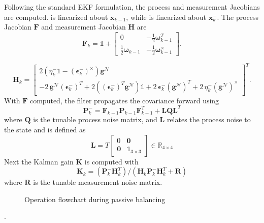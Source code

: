 Following the standard EKF formulation, the process and measurement Jacobians are computed.  is linearized about $\bm{x}_{k-1}$, while  is linearized about $\bm{x}_k^-$. The process Jacobian $\bm{F}$ and measurement Jacobian $\bm{H}$ are 
\begin{equation}
    \bm{F}_k = \mathbb{1}+
\begin{bmatrix}
0 & -\tfrac{1}{2}\bm{\omega}_{k-1}^{T}\\[3pt]
\tfrac{1}{2}\bm{\omega}_{k-1} & -\tfrac{1}{2}\bm{\omega}_{k-1}^{\times}
\end{bmatrix}.
\end{equation}

\begin{equation}
\bm{H}_k =
\begin{bmatrix}
2\!\left(\eta_k^- \mathbb{1} - (\bm{\epsilon}_k^-)^{\times}\right)\bm{g}^{\mathcal N}
\\
-2\,\bm{g}^{\mathcal N}(\bm{\epsilon}_k^-)^{\!T}
+2\!\left((\bm{\epsilon}_k^-)^{\!T}\bm{g}^{\mathcal N}\right)\mathbb{1}
+2\,\bm{\epsilon}_k^- (\bm{g}^{\mathcal N})^{\!T}
+2\,\eta_k^- (\bm{g}^{\mathcal N})^{\times}
\end{bmatrix}^T.
\end{equation}
With $\bm{F}$ computed, the filter propagates the covariance forward using
\begin{equation}
        \bm{P}_k^- = \bm{F}_{k-1}\bm{P}_{k-1}\bm{F}_{k-1}^T + \bm{L}\bm{Q}\bm{L}^T
\end{equation}
where $\bm{Q}$ is the tunable process noise matrix, and $\bm{L}$ relates the process noise to the state and is defined as
\begin{equation}
    \bm{L} = T\begin{bmatrix}
        0      & \bm{0} \\
        \bm{0} & \mathbb{1}_{3\times3}
    \end{bmatrix}\in\mathbb{R}_{4\times4}
\end{equation}
Next the Kalman gain $\bm{K}$ is computed with
\begin{equation}
    \bm{K}_k = (\bm{P}_k^-\bm{H}_k^T)/(\bm{H}_k\bm{P}_k^-\bm{H}_k^T + \bm{R})
\end{equation}
where $\bm{R}$ is the tunable measurement noise matrix.
\begin{figure}
    \centering
    
    \caption{Operation flowchart during passive balancing}
    \label{fig:sys_arch_passive}
\end{figure}.
